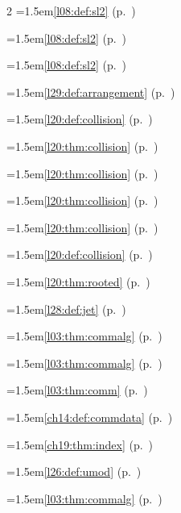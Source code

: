\begin{multicols}{2}
\hangindent=1.5em\quad \ref{l08:def:sl2} (p.~\pageref{l08:def:sl2})\par
\hangindent=1.5em\quad \ref{l08:def:sl2} (p.~\pageref{l08:def:sl2})\par
\hangindent=1.5em\quad \ref{l08:def:sl2} (p.~\pageref{l08:def:sl2})\par
\hangindent=1.5em\quad \ref{l29:def:arrangement} (p.~\pageref{l29:def:arrangement})\par
\hangindent=1.5em\quad \ref{l20:def:collision} (p.~\pageref{l20:def:collision})\par
\hangindent=1.5em\quad \ref{l20:thm:collision} (p.~\pageref{l20:thm:collision})\par
\hangindent=1.5em\quad \ref{l20:thm:collision} (p.~\pageref{l20:thm:collision})\par
\hangindent=1.5em\quad \ref{l20:thm:collision} (p.~\pageref{l20:thm:collision})\par
\hangindent=1.5em\quad \ref{l20:thm:collision} (p.~\pageref{l20:thm:collision})\par
\hangindent=1.5em\quad \ref{l20:def:collision} (p.~\pageref{l20:def:collision})\par
\hangindent=1.5em\quad \ref{l20:thm:rooted} (p.~\pageref{l20:thm:rooted})\par
\hangindent=1.5em\quad \ref{l28:def:jet} (p.~\pageref{l28:def:jet})\par
\hangindent=1.5em\quad \ref{l03:thm:commalg} (p.~\pageref{l03:thm:commalg})\par
\hangindent=1.5em\quad \ref{l03:thm:commalg} (p.~\pageref{l03:thm:commalg})\par
\hangindent=1.5em\quad \ref{l03:thm:comm} (p.~\pageref{l03:thm:comm})\par
\hangindent=1.5em\quad \ref{ch14:def:commdata} (p.~\pageref{ch14:def:commdata})\par
\hangindent=1.5em\quad \ref{ch19:thm:index} (p.~\pageref{ch19:thm:index})\par
\hangindent=1.5em\quad \ref{l26:def:umod} (p.~\pageref{l26:def:umod})\par
\hangindent=1.5em\quad \ref{l03:thm:commalg} (p.~\pageref{l03:thm:commalg})\par

\end{multicols}
